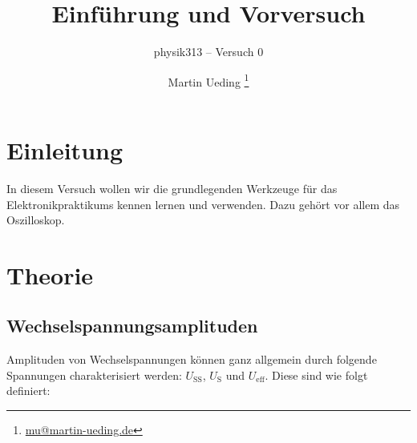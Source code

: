 




\subject{Praktikumsprotokoll}
\title{Einführung und Vorversuch}
\subtitle{physik313 – Versuch 0}
\author{
	Martin Ueding \footnote{\href{mailto:mu@martin-ueding.de}{mu@martin-ueding.de}}
}
\publishers{Gruppe 3 -- A -- Brezina}



\maketitle

\tableofcontents
\newpage


\section{Einleitung}

In diesem Versuch wollen wir die grundlegenden Werkzeuge für das
Elektronikpraktikums kennen lernen und verwenden. Dazu gehört vor allem das
Oszilloskop.


\section{Theorie}

\subsection{Wechselspannungsamplituden}

Amplituden von Wechselspannungen können ganz allgemein durch folgende
Spannungen charakterisiert werden: $U_\text{SS}$, $U_\text{S}$ und
$U_\text{eff}$. Diese sind wie folgt definiert:


